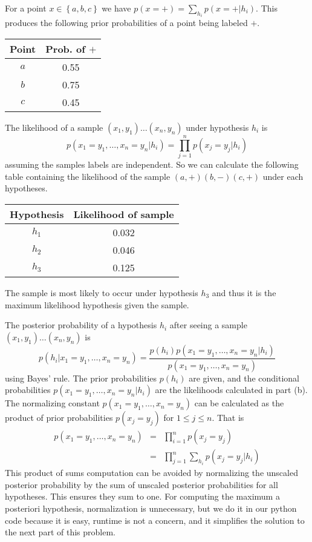 \documentclass[12pt]{article}
\newcounter{alphaenum}
\newenvironment{abclist}
    { \begin{list}{(\alph{alphaenum}) ~} { \setcounter{alphaenum}{1} \usecounter{alphaenum} } }
    { \end{list} }
\begin{document}
\begin{abclist}
\item For a point $x\in \left\{a,b,c\right\}$ we have $p(x=+) = \sum_{h_i}p(x=+|h_i)$.
    This produces the following prior probabilities of a point being labeled $+$.
    \begin{center}
        \begin{tabular}{|c|c|}
            \hline
            Point & Prob. of $+$ \\
            \hline
            $a$ & 0.55 \\
            $b$ & 0.75 \\
            $c$ & 0.45 \\
            \hline
        \end{tabular}
    \end{center}
\item The likelihood of a sample $(x_1,y_1)\dots(x_n,y_n)$ under hypothesis $h_i$ is \[p(x_1 = y_1, \dots, x_n = y_n | h_i) = \prod_{j=1}^{n}p(x_j = y_j | h_i)\] assuming the samples labels are independent.
    So we can calculate the following table containing the likelihood of the sample $(a,+)(b,-)(c,+)$ under each hypotheses.
    \begin{center}
        \begin{tabular}{|c|c|}
            \hline
            Hypothesis & Likelihood of sample \\
            \hline
            $h_1$ & 0.032 \\
            $h_2$ & 0.046 \\
            $h_3$ & 0.125 \\
            \hline
        \end{tabular}
    \end{center}
    The sample is most likely to occur under hypothesis $h_3$ and thus it is the maximum likelihood hypothesis given the sample.
\item The posterior probability of a hypothesis $h_i$ after seeing a sample $(x_1,y_1)\dots(x_n,y_n)$ is \[ p(h_i|x_1=y_1,\dots,x_n=y_n) = \frac{p(h_i)p(x_1=y_1,\dots,x_n=y_n | h_i)}{p(x_1=y_1,\dots,x_n=y_n)} \] using Bayes' rule.
    The prior probabilities $p(h_i)$ are given, and the conditional probabilities $p(x_1=y_1,\dots,x_n=y_n | h_i)$ are the likelihoods calculated in part (b).
    The normalizing constant $p(x_1=y_1,\dots,x_n=y_n)$ can be calculated as the product of prior probabilities $p(x_j=y_j)$ for $1 \leq j \leq n$.
    That is 
    \begin{eqnarray}
        p(x_1=y_1,\dots,x_n=y_n) &=& \prod_{i=1}^{n} p(x_j=y_j) \\
        &=& \prod_{j=1}^{n} \sum_{h_i}p(x_j=y_j|h_i)
    \end{eqnarray}
    This product of sums computation can be avoided by normalizing the unscaled posterior probability by the sum of unscaled posterior probabilities for all hypotheses.
    This ensures they sum to one.
    For computing the maximum a posteriori hypothesis, normalization is unnecessary,
    but we do it in our python code because it is easy, runtime is not a concern, and it simplifies the solution to the next part of this problem.
    

\end{abclist}
\end{document}
